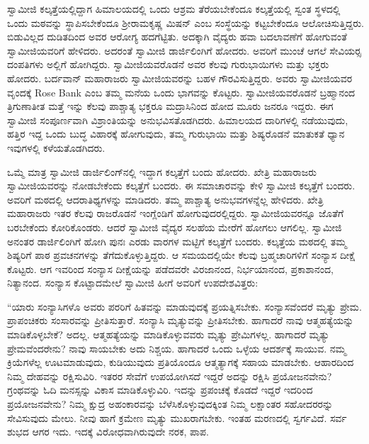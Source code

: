  ಸ್ವಾಮೀಜಿ ಕಲ್ಕತ್ತೆಯಲ್ಲಿದ್ದಾಗ ಹಿಮಾಲಯದಲ್ಲಿ ಒಂದು ಆಶ್ರಮ ತೆರೆಯಬೇಕೆಂದೂ ಕಲ್ಕತ್ತೆಯಲ್ಲಿ ಸ್ವಂತ ಸ್ಥಳದಲ್ಲಿ ಒಂದು ಮಠವನ್ನು ಸ್ಥಾಪಿಸಬೇಕೆಂದೂ ಶ‍್ರೀರಾಮಕೃಷ್ಣ ಮಿಷನ್ ಎಂಬ ಸಂಸ್ಥೆಯನ್ನು ಕಟ್ಟಬೇಕೆಂದೂ ಆಲೋಚಿಸುತ್ತಿದ್ದರು. ಬಿಡುವಿಲ್ಲದ ದುಡಿತದಿಂದ ಅವರ ಆರೋಗ್ಯ ಹದಗೆಟ್ಟಿತು. ಅದಕ್ಕಾಗಿ ವೈದ್ಯರು ಹವಾ ಬದಲಾವಣೆಗೆ ಹೋಗುವಂತೆ ಸ್ವಾಮೀಜಿಯವರಿಗೆ ಹೇಳಿದರು. ಅದರಂತೆ ಸ್ವಾಮೀಜಿ ಡಾರ್ಜಿಲಿಂಗಿಗೆ ಹೋದರು. ಅವರಿಗೆ ಮುಂಚೆ ಆಗಲೆ ಸೇವಿಯರ‍್ಸ ದಂಪತಿಗಳು ಅಲ್ಲಿಗೆ ಹೋಗಿದ್ದರು. ಸ್ವಾಮೀಜಿಯವರೊಡನೆ ಅವರ ಕೆಲವು ಗುರುಭಾಯಿಗಳು ಮತ್ತು ಭಕ್ತರು ಹೋದರು. ಬರ್ದವಾನ್ ಮಹಾರಾಜರು ಸ್ವಾಮೀಜಿಯವರನ್ನು ಬಹಳ ಗೌರವಿಸುತ್ತಿದ್ದರು. ಅವರು ಸ್ವಾಮೀಜಿಯವರ ವೃಂದಕ್ಕೆ Rose Bank ಎಂಬ ತಮ್ಮ ಮನೆಯ ಒಂದು ಭಾಗವನ್ನು ಕೊಟ್ಟರು. ಸ್ವಾಮೀಜಿಯವರೊಡನೆ ಬ್ರಹ್ಮಾನಂದ ತ್ರಿಗುಣಾತೀತ ಮತ್ತೆ ಇನ್ನು ಕೆಲವು ಪಾಶ್ಚಾತ್ಯ ಭಕ್ತರೂ ಮದ್ರಾಸಿನಿಂದ ಹೋದ ಮೂರು ಜನರೂ ಇದ್ದರು. ಈಗ ಸ್ವಾಮೀಜಿ ಸಂಪೂರ್ಣವಾಗಿ ವಿಶ್ರಾಂತಿಯನ್ನು ಅನುಭವಿಸತೊಡಗಿದರು. ಹಿಮಾಲಯದ ದಾರಿಗಳಲ್ಲಿ ನಡೆಯುವುದು, ಹತ್ತಿರ ಇದ್ದ ಒಂದು ಬುದ್ಧ ವಿಹಾರಕ್ಕೆ ಹೋಗುವುದು, ತಮ್ಮ ಗುರುಭಾಯಿ ಮತ್ತು ಶಿಷ್ಯರೊಡನೆ ಮಾತುಕತೆ ಧ್ಯಾನ ಇವುಗಳಲ್ಲಿ ಕಳೆಯತೊಡಗಿದರು. 

\vskip 1pt

 ಒಮ್ಮೆ ಮಾತ್ರ ಸ್ವಾಮೀಜಿ ಡಾರ್ಜಿಲಿಂಗ್‍ನಲ್ಲಿ ಇದ್ದಾಗ ಕಲ್ಕತ್ತೆಗೆ ಬಂದು ಹೋದರು. ಖೇತ್ರಿ ಮಹಾರಾಜರು ಸ್ವಾಮೀಜಿಯವರನ್ನು ನೋಡಬೇಕೆಂದು ಕಲ್ಕತ್ತೆಗೆ ಬಂದರು. ಈ ಸಮಾಚಾರವನ್ನು ಕೇಳಿ ಸ್ವಾಮೀಜಿ ಕಲ್ಕತ್ತೆಗೆ ಬಂದರು. ಅವರಿಗೆ ಮಠದಲ್ಲಿ ಆದರಾತಿಥ್ಯಗಳನ್ನು ಮಾಡಿದರು. ತಮ್ಮ ಪಾಶ್ಚಾತ್ಯ ಅನುಭವಗಳನ್ನೆಲ್ಲ ಹೇಳಿದರು. ಖೇತ್ರಿ ಮಹಾರಾಜರು ಇತರ ಕೆಲವು ರಾಜರೊಡನೆ ಇಂಗ್ಲೆಂಡಿಗೆ ಹೋಗುವುದರಲ್ಲಿದ್ದರು. ಸ್ವಾಮೀಜಿಯವರನ್ನೂ ಜೊತೆಗೆ ಬರಬೇಕೆಂದು ಕೋರಿಕೊಂಡರು. ಆದರೆ ಸ್ವಾಮೀಜಿ ವೈದ್ಯರ ಸಲಹೆಯ ಮೇರೆಗೆ ಹೋಗಲು ಆಗಲಿಲ್ಲ. ಸ್ವಾಮೀಜಿ ಅನಂತರ ಡಾರ್ಜಿಲಿಂಗಿಗೆ ಹೋಗಿ ಪುನಃ ಎರಡು ವಾರಗಳ ಮಟ್ಟಿಗೆ ಕಲ್ಕತ್ತೆಗೆ ಬಂದರು. ಕಲ್ಕತ್ತೆಯ ಮಠದಲ್ಲಿ ತಮ್ಮ ಶಿಷ್ಯರಿಗೆ ಪಾಠ ಪ್ರವಚನಗಳನ್ನು ತೆಗೆದುಕೊಳ್ಳುತ್ತಿದ್ದರು. ಆ ಸಮಯದಲ್ಲಿಯೇ ಕೆಲವು ಬ್ರಹ್ಮಚಾರಿಗಳಿಗೆ ಸಂನ್ಯಾಸ ದೀಕ್ಷೆ ಕೊಟ್ಟರು. ಆಗ ಇವರಿಂದ ಸಂನ್ಯಾಸ ದೀಕ್ಷೆಯನ್ನು ಪಡೆದವರೇ ವಿರಜಾನಂದ, ನಿರ್ಭಯಾನಂದ, ಪ್ರಕಾಶಾನಂದ, ನಿತ್ಯಾನಂದ. ಸಂನ್ಯಾಸ ಕೊಟ್ಟಾದಮೇಲೆ ಸ್ವಾಮೀಜಿ ಹೀಗೆ ಅವರಿಗೆ ಉಪದೇಶವಿತ್ತರು: 

\vskip 1pt

 “ಯಾರು ಸಂನ್ಯಾಸಿಗಳೊ ಅವರು ಪರರಿಗೆ ಹಿತವನ್ನು ಮಾಡುವುದಕ್ಕೆ ಪ್ರಯತ್ನಿಸಬೇಕು. ಸಂನ್ಯಾಸವೆಂದರೆ ಮೃತ್ಯು ಪ್ರೇಮ. ಪ್ರಾಪಂಚಿಕರು ಸಂಸಾರವನ್ನು ಪ್ರೀತಿಸುತ್ತಾರೆ. ಸಂನ್ಯಾಸಿ ಮೃತ್ಯುವನ್ನು ಪ್ರೀತಿಸಬೇಕು. ಹಾಗಾದರೆ ನಾವು ಆತ್ಮಹತ್ಯೆಯನ್ನು ಮಾಡಿಕೊಳ್ಳಬೇಕೆ? ಅದಲ್ಲ. ಆತ್ಮಹತ್ಯೆಯನ್ನು ಮಾಡಿಕೊಳ್ಳುವವರು ಮೃತ್ಯು ಪ್ರೇಮಿಗಳಲ್ಲ. ಹಾಗಾದರೆ ಮೃತ್ಯು ಪ್ರೇಮವೆಂದರೇನು? ನಾವು ಸಾಯಬೇಕು ಅದು ನಿಶ್ಚಯ. ಹಾಗಾದರೆ ಒಂದು ಒಳ್ಳೆಯ ಆದರ್ಶಕ್ಕೆ ಸಾಯುವ. ನಮ್ಮ ಕ್ರಿಯೆಗಳೆಲ್ಲ ಊಟಮಾಡುವುದು, ಕುಡಿಯುವುದು ಪ್ರತಿಯೊಂದೂ ಆತ್ಮತ್ಯಾಗಕ್ಕೆ ಸಹಾಯ ಮಾಡಬೇಕು. ಆಹಾರದಿಂದ ನಿಮ್ಮ ದೇಹವನ್ನು ರಕ್ಷಿಸುವಿರಿ. ಇತರರ ಸೇವೆಗೆ ಉಪಯೋಗಿಸದೆ ಇದ್ದರೆ ಅದನ್ನು ರಕ್ಷಿಸಿ ಪ್ರಯೋಜನವೇನು? ಗ್ರಂಥವನ್ನು ಓದಿ ಮನಸ್ಸನ್ನು ವಿಕಾಸ ಮಾಡಿಕೊಳ್ಳುವಿರಿ. ಇದನ್ನು ಪ್ರಪಂಚಕ್ಕೆ ಕೊಡದೆ ಇದ್ದರೆ ಇದರಿಂದ ಪ್ರಯೋಜನವೇನು? ನಿಮ್ಮ ಕ್ಷುದ್ರ ಅಹಂಕಾರವನ್ನು ಬೆಳೆಸಿಕೊಳ್ಳುವುದಕ್ಕಿಂತ ನಿಮ್ಮ ಲಕ್ಷಾಂತರ ಸಹೋದರರನ್ನು ಸೇವಿಸುವುದು ಮೇಲು. ನೀವು ಹಾಗೆ ಕ್ರಮೇಣ ಮೃತ್ಯು ಮುಖರಾಗಬೇಕು. ಇಂತಹ ಮರಣದಲ್ಲಿ ಸ್ವರ್ಗವಿದೆ. ಸರ್ವ ಶುಭದ ಆಗರ ಇದು. ಇದಕ್ಕೆ ವಿರೋಧವಾಗಿರುವುದೇ ನರಕ, ಪಾಪ.

